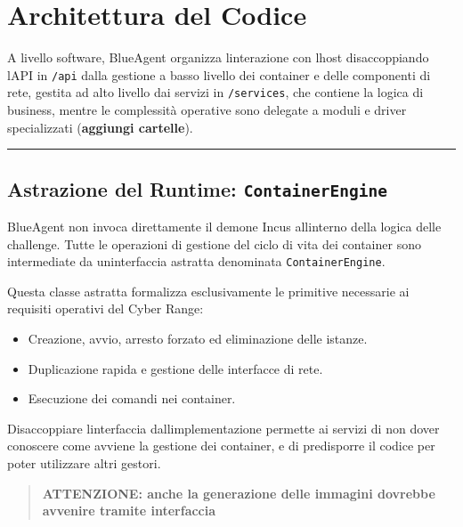 \section{Architettura del Codice}\label{architettura-del-codice}

A livello software, BlueAgent organizza l\textquotesingle interazione
con l\textquotesingle host disaccoppiando l\textquotesingle API in
\passthrough{\lstinline!/api!} dalla gestione a basso livello dei
container e delle componenti di rete, gestita ad alto livello dai
servizi in \passthrough{\lstinline!/services!}, che contiene la logica
di business, mentre le complessità operative sono delegate a moduli e
driver specializzati (\textbf{aggiungi cartelle}).

\begin{center}\rule{0.5\linewidth}{0.5pt}\end{center}

\subsection{\texorpdfstring{Astrazione del Runtime:
\texttt{ContainerEngine}}{Astrazione del Runtime: ContainerEngine}}\label{astrazione-del-runtime-containerengine}

BlueAgent non invoca direttamente il demone Incus
all\textquotesingle interno della logica delle challenge. Tutte le
operazioni di gestione del ciclo di vita dei container sono intermediate
da un\textquotesingle interfaccia astratta denominata
\passthrough{\lstinline!ContainerEngine!}.

Questa classe astratta formalizza esclusivamente le primitive necessarie
ai requisiti operativi del Cyber Range:

\begin{itemize}
\tightlist
\item
  Creazione, avvio, arresto forzato ed eliminazione delle istanze.
\item
  Duplicazione rapida e gestione delle interfacce di rete.
\item
  Esecuzione dei comandi nei container.
\end{itemize}

Disaccoppiare l\textquotesingle interfaccia
dall\textquotesingle implementazione permette ai servizi di non dover
conoscere come avviene la gestione dei container, e di predisporre il
codice per poter utilizzare altri gestori.

\begin{quote}
\textbf{ATTENZIONE: anche la generazione delle immagini dovrebbe
avvenire tramite interfaccia}
\end{quote}

